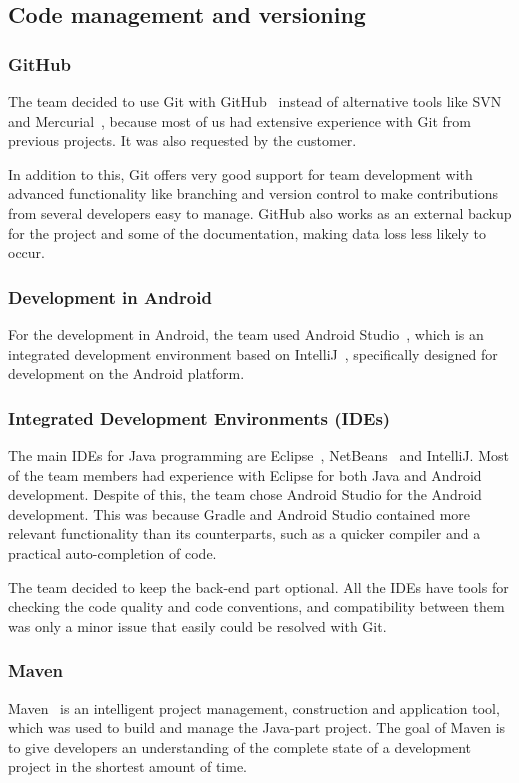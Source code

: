 \subsection{Code management and versioning}
\subsubsection{GitHub}
The team decided to use Git with GitHub~\cite{github} instead of alternative tools like SVN~\cite{svn} and Mercurial~\cite{mercurial}, because most of us had extensive experience with Git from previous projects. It was also requested by the customer. 

In addition to this, Git offers very good support for team development with advanced functionality like branching and version control to make contributions from several developers easy to manage. GitHub also works as an external backup for the project and some of the documentation, making data loss less likely to occur.

\subsubsection{Development in Android}
For the development in Android, the team used Android Studio~\cite{android-studio}, which is an integrated development environment based on IntelliJ~\cite{intellij}, specifically designed for development on the Android platform.

\subsubsection{Integrated Development Environments (IDEs)}
The main IDEs for Java programming are Eclipse~\cite{eclipse}, NetBeans~\cite{netbeans} and IntelliJ. Most of the team members had experience with Eclipse for both Java and Android development. Despite of this, the team chose Android Studio for the Android development. This was because Gradle and Android Studio contained more relevant functionality than its counterparts, such as a quicker compiler and a practical auto-completion of code.%

The team decided to keep the back-end part optional. All the IDEs have tools for checking the code quality and code conventions, and compatibility between them was only a minor issue that easily could be resolved with Git.

\subsubsection{Maven}
Maven~\cite{maven} is an intelligent project management, construction and application tool, which was used to build and manage the Java-part project. The goal of Maven is to give developers an understanding of the complete state of a development project in the shortest amount of time.

